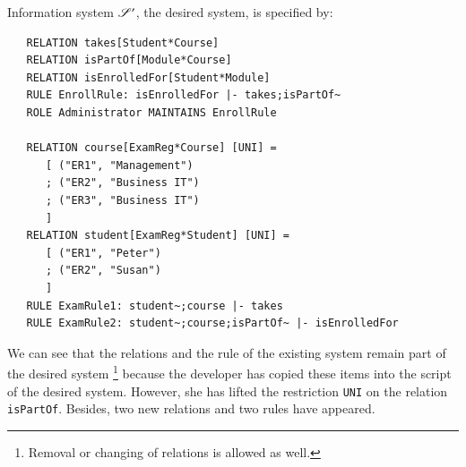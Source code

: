 \documentclass{elsarticle}
\begin{document}
   Information system $\mathscr{S}'$, the desired system, is specified by:
\begin{verbatim}
   RELATION takes[Student*Course]
   RELATION isPartOf[Module*Course]
   RELATION isEnrolledFor[Student*Module]
   RULE EnrollRule: isEnrolledFor |- takes;isPartOf~
   ROLE Administrator MAINTAINS EnrollRule
   
   RELATION course[ExamReg*Course] [UNI] =
      [ ("ER1", "Management")
      ; ("ER2", "Business IT")
      ; ("ER3", "Business IT")
      ]
   RELATION student[ExamReg*Student] [UNI] =
      [ ("ER1", "Peter")
      ; ("ER2", "Susan")
      ]
   RULE ExamRule1: student~;course |- takes
   RULE ExamRule2: student~;course;isPartOf~ |- isEnrolledFor
\end{verbatim}
   We can see that the relations and the rule of the existing system remain part of the desired system%
\footnote{Removal or changing of relations is allowed as well.}
   because the developer has copied these items into the script of the desired system.
   However, she has lifted the restriction \verb-UNI- on the relation {\tt isPartOf}.
   Besides, two new relations and two rules have appeared.
\end{document}

